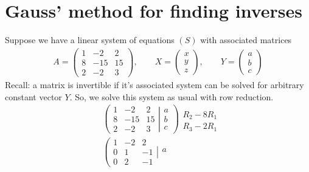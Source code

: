 \documentclass[usenames,dvipsnames,aspectratio=169,10pt]{beamer}
\numberwithin{equation}{section}
\begin{document}
\section{Gauss' method for finding inverses}



\begin{frame}
Suppose we have a linear system of equations $(S)$ with associated matrices
\begin{align*}
A=
\begin{pmatrix}
   1 &  -2 &  2 \\
   8 & -15 & 15 \\
   2 &  -2 &  3
\end{pmatrix}, \qquad
X = 
\begin{pmatrix}
x \\
y \\
z
\end{pmatrix}, \qquad
Y
=
\begin{pmatrix}
a \\
b \\
c
\end{pmatrix}
\end{align*}
Recall: a matrix is invertible if it's associated system can be solved for arbitrary constant vector $Y$. So, we solve this system as usual with row reduction.
\begin{align*}
&
\left(
	\begin{matrix}
   1 &  -2 &  2 \\
   8 & -15 & 15 \\
   2 &  -2 &  3
	\end{matrix}
  \left|
	\begin{matrix}
		a \\
		b \\
		c
	\end{matrix}
  \right.
\right)
\begin{array}{l}
   \\
 R_2 - 8R_1 \\
 R_3 - 2R_1
\end{array}
\\
&
\left(
	\begin{matrix}
   1 &  -2 &  2 \\
   0 &   1 & -1 \\
   0 &   2 & -1
	\end{matrix}
  \left|
	\begin{matrix}
		a \\

\end{matrix}
\end{align*}
\end{frame}
\end{document}
